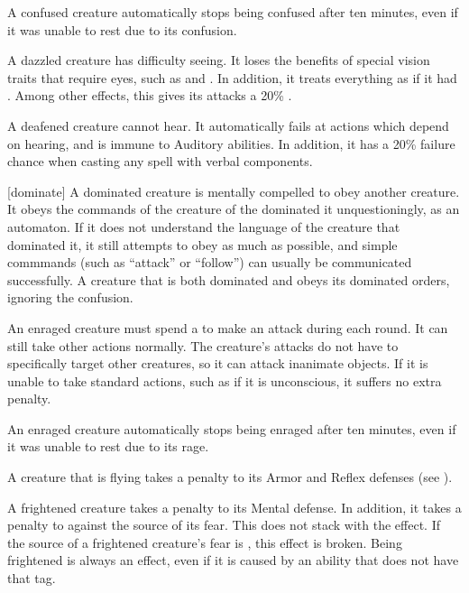   A confused creature automatically stops being confused after ten minutes, even if it was unable to rest due to its confusion.

   A dazzled creature has difficulty seeing.
  It loses the benefits of special vision traits that require eyes, such as  and .
  In addition, it treats everything as if it had .
  Among other effects, this gives its  attacks a 20\% .

   A deafened creature cannot hear.
  It automatically fails at actions which depend on hearing, and is immune to Auditory abilities.
  In addition, it has a 20\% failure chance when casting any spell with verbal components.

  [dominate] A dominated creature is mentally compelled to obey another creature.
  It obeys the commands of the creature of the dominated it unquestioningly, as an automaton.
  If it does not understand the language of the creature that dominated it, it still attempts to obey as much as possible, and simple commmands (such as ``attack'' or ``follow'') can usually be communicated successfully.
  A creature that is both dominated and \confused obeys its dominated orders, ignoring the confusion.

   An enraged creature must spend a  to make an attack during each round.
  It can still take other actions normally.
  The creature's attacks do not have to specifically target other creatures, so it can attack inanimate objects.
  If it is unable to take standard actions, such as if it is unconscious, it suffers no extra penalty.

  An enraged creature automatically stops being enraged after ten minutes, even if it was unable to rest due to its rage.

   A creature that is flying takes a  penalty to its Armor and Reflex defenses (see ).

   A frightened creature takes a  penalty to its Mental defense.
  In addition, it takes a  penalty to  against the source of its fear.
  This does not stack with the \panicked effect.
  If the source of a frightened creature's fear is , this effect is broken.
  Being frightened is always an  effect, even if it is caused by an ability that does not have that tag.


